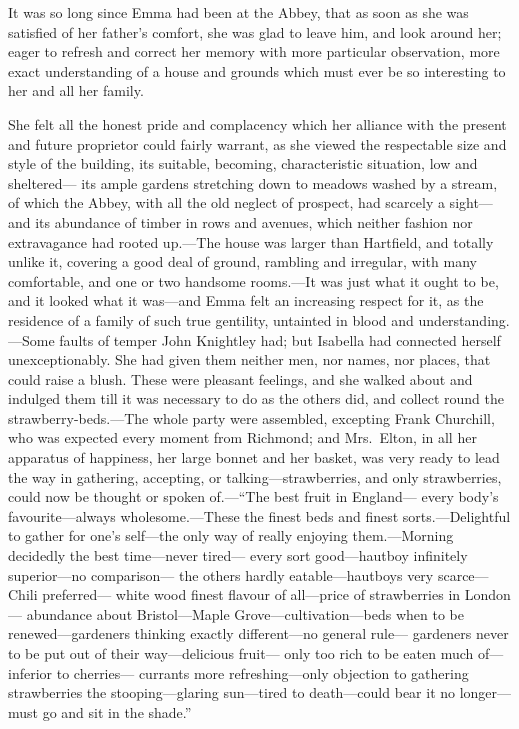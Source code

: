 It was so long since Emma had been at the Abbey, that as soon as she
was satisfied of her father's comfort, she was glad to leave him,
and look around her; eager to refresh and correct her memory with
more particular observation, more exact understanding of a house
and grounds which must ever be so interesting to her and all her family.

She felt all the honest pride and complacency which her alliance
with the present and future proprietor could fairly warrant,
as she viewed the respectable size and style of the building,
its suitable, becoming, characteristic situation, low and sheltered---%
its ample gardens stretching down to meadows washed by a stream,
of which the Abbey, with all the old neglect of prospect,
had scarcely a sight---and its abundance of timber in rows and avenues,
which neither fashion nor extravagance had rooted up.---The house
was larger than Hartfield, and totally unlike it, covering a good
deal of ground, rambling and irregular, with many comfortable,
and one or two handsome rooms.---It was just what it ought to be,
and it looked what it was---and Emma felt an increasing respect
for it, as the residence of a family of such true gentility,
untainted in blood and understanding.---Some faults of temper John
Knightley had; but Isabella had connected herself unexceptionably.
She had given them neither men, nor names, nor places, that could
raise a blush.  These were pleasant feelings, and she walked about
and indulged them till it was necessary to do as the others did,
and collect round the strawberry-beds.---The whole party were assembled,
excepting Frank Churchill, who was expected every moment from Richmond;
and Mrs.\ Elton, in all her apparatus of happiness, her large bonnet
and her basket, was very ready to lead the way in gathering,
accepting, or talking---strawberries, and only strawberries,
could now be thought or spoken of.---``The best fruit in England---%
every body's favourite---always wholesome.---These the finest beds
and finest sorts.---Delightful to gather for one's self---the only way
of really enjoying them.---Morning decidedly the best time---never tired---%
every sort good---hautboy infinitely superior---no comparison---%
the others hardly eatable---hautboys very scarce---Chili preferred---%
white wood finest flavour of all---price of strawberries in London---%
abundance about Bristol---Maple Grove---cultivation---beds when to
be renewed---gardeners thinking exactly different---no general rule---%
gardeners never to be put out of their way---delicious fruit---%
only too rich to be eaten much of---inferior to cherries---%
currants more refreshing---only objection to gathering strawberries
the stooping---glaring sun---tired to death---could bear it no longer---%
must go and sit in the shade.''

